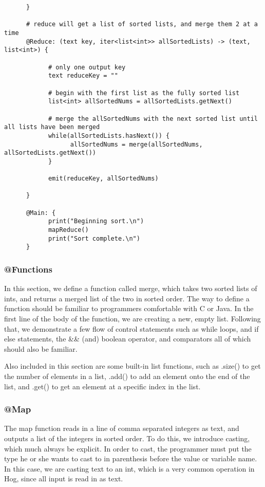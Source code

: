 \documentclass{article} \usepackage{fancyhdr, multicol}
\begin{document}
\begin{verbatim}
      }
      
      # reduce will get a list of sorted lists, and merge them 2 at a time
      @Reduce: (text key, iter<list<int>> allSortedLists) -> (text, list<int>) {
            
            # only one output key
            text reduceKey = ""
            
            # begin with the first list as the fully sorted list 
            list<int> allSortedNums = allSortedLists.getNext()
            
            # merge the allSortedNums with the next sorted list until all lists have been merged
            while(allSortedLists.hasNext()) {
                  allSortedNums = merge(allSortedNums, allSortedLists.getNext())
            }
            
            emit(reduceKey, allSortedNums)
            
      }
      
      @Main: {
            print("Beginning sort.\n")
            mapReduce()
            print("Sort complete.\n")
      }

\end{verbatim}

\subsubsection*{@Functions}
In this section, we define a function called merge, which takes two sorted lists of ints, and returns a merged list of the two in sorted order. The way to define a function should be familiar to programmers comfortable with C or Java. In the first line of the body of the function, we are creating a new, empty list. Following that, we demonstrate a few flow of control statements such as while loops, and if else statements, the \&\& (and) boolean operator, and comparators all of which should also be familiar. 

Also included in this section are some built-in list functions, such as .size() to get the number of elements in a list, .add() to add an element onto the end of the list, and .get() to get an element at a specific index in the list.

\subsubsection*{@Map}
The map function reads in a line of comma separated integers as text, and outputs a list of the integers in sorted order. To do this, we introduce casting, which much always be explicit. In order to cast, the programmer must put the type he or she wants to cast to in parenthesis before the value or variable name. In this case, we are casting text to an int, which is a very common operation in Hog, since all input is read in as text.
\end{document}
